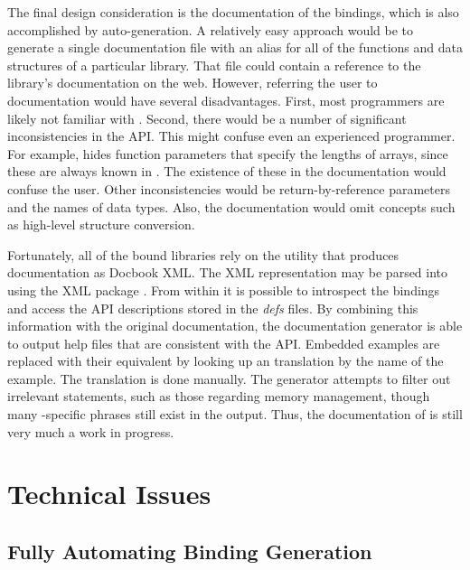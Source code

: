 \documentclass[article]{jss}
\begin{document}
The final design consideration is the documentation of the bindings,
which is also accomplished by auto-generation. A relatively easy approach
would be to generate a single documentation file with an alias for all of
the functions and data structures of a particular library. That file could
contain a reference to the library's  documentation on the web. 
However, referring the user to  documentation would have
several disadvantages. First, most  programmers are likely not
familiar with . Second, there would be a
number of significant inconsistencies in the API. This might confuse
even an experienced  programmer.
For example,  hides function parameters that specify the lengths of 
arrays, since these are always known in . The existence of these in 
the  documentation would confuse the  user. Other 
inconsistencies would be return-by-reference parameters and the names of data 
types. Also, the  documentation would omit concepts such as
high-level structure conversion.

Fortunately, all of the bound libraries rely on the  utility that 
produces documentation as Docbook XML. The XML representation may be
parsed into  using the XML package \citep{XML}. From within  it is possible
to introspect the bindings and access the API descriptions stored
in the \emph{defs} files. By combining this information with the original 
documentation, the documentation generator is able to output  help
files that are consistent with the  API. Embedded  
examples are replaced with their  equivalent by looking up
an  translation by the name of the example. The translation is
done manually. The generator attempts to filter out irrelevant statements, 
such as those  regarding memory management, though many -specific 
phrases still exist in the output. Thus, the documentation of 
is still very much a work in progress.

\section{Technical Issues}

\subsection{Fully Automating Binding Generation}
\end{document}
